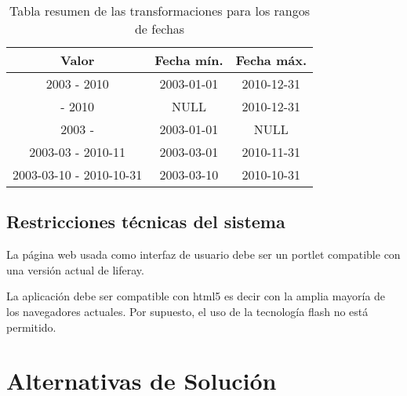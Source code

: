 \begin{center}
	\begin {table}[H]
	\centering
      \begin{tabular}{| c | c | c|}
      \hline
      \textbf{Valor} & \textbf{Fecha mín.} & \textbf{Fecha máx.}\\ \hline
      2003 - 2010 & 2003-01-01 & 2010-12-31 \\ \hline
          - 2010 			& NULL				& 2010-12-31   	\\ \hline
      2003 - 			& 2003-01-01 				& NULL  	\\ \hline
      2003-03 - 2010-11 			& 2003-03-01 				& 2010-11-31   	\\ \hline
      2003-03-10 - 2010-10-31 			& 2003-03-10 				& 2010-10-31   	\\ \hline
      \end{tabular}
    \caption{Tabla resumen de las transformaciones para los rangos de fechas}
    \label{table:transformtab}
  \end{table}
\end{center}

\subsection{Restricciones técnicas del sistema}

La página web usada como interfaz de usuario debe ser un \gls{portlet} compatible con una versión actual de \gls{liferay}.

La aplicación debe ser compatible con \gls{html5} es decir con la amplia mayoría de los navegadores actuales. Por supuesto, el uso de la tecnología \gls{flash} no está permitido.



\section{Alternativas de Solución} 

